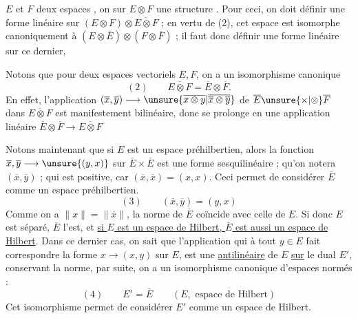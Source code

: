  $E$ et $F$ deux espaces  , on  sur $E\otimes F$ une structure   .
Pour ceci, on doit définir une forme linéaire sur $(E\otimes F)\otimes\overline{E\otimes F}$ ;  en vertu de (2),  cet espace est isomorphe canoniquement à $(E\otimes\overline E)\otimes(F\otimes\overline F)$ ; il faut donc définir une forme linéaire sur ce dernier, 

Notons que pour deux espaces vectoriels $E,F$, on a un isomorphisme canonique
\[
(2)\qquad\overline{E\otimes F}=\overline E\otimes\overline F.
\]
En effet, l'application $(\overline x,\overline y)\longrightarrow\unsure{\overline{x\otimes y}|\overline{\overline x\otimes\overline y}}$ de $\overline E\unsure{\times|\otimes}\overline F$ dans $\overline{E\otimes F}$ est manifestement bilinéaire, donc se prolonge en une application linéaire $\overline E\otimes\overline F\longrightarrow\overline{E\otimes F}$

Notons maintenant que si $E$ est un espace préhilbertien, alors la fonction $\overline x,\overline y\longrightarrow\unsure{(y,x)}$ sur $\overline E\times\overline E$ est une forme sesquilinéaire ; qu'on notera $(\overline x,\overline y)$ ; qui  est   positive, car $(\overline x,\overline x)=(x,x)$.
Ceci permet de considérer $\overline E$ comme un espace préhilbertien.
\[
(3)\qquad(\overline x,\overline y)=(y,x)
\]
Comme on a $\|x\|=\|\overline x\|$, la norme de $\overline E$ coïncide avec celle de $E$. Si donc $E$ est séparé, $\overline E$ l'est, et \uline{si $E$ est un espace de Hilbert, $\overline E$ est aussi un espace de Hilbert}.
Dans ce dernier cas, on sait que l'application qui à tout $y\in E$ fait correspondre la forme $x\longrightarrow(x,y)$ sur $E$, est une   \uline{antilinéaire} de $E$ \uline{sur} le dual $E'$, conservant la norme, par suite, on a   un isomorphisme canonique d'espaces normés :
\[
(4)\qquad E'=\overline E\qquad(E,\text{ espace de Hilbert})
\]
Cet isomorphisme permet de considérer $E'$ comme   un espace de Hilbert.

